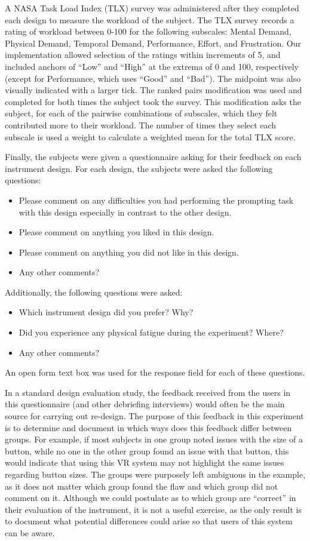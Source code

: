 A NASA Task Load Index (TLX) survey was administered after they completed each design to measure the workload of the subject.
The TLX survey records a rating of workload between 0-100 for the following subscales: Mental Demand, Physical Demand, Temporal Demand, Performance, Effort, and Frustration.
Our implementation allowed selection of the ratings within increments of 5, and included anchors of ``Low'' and ``High'' at the extrema of 0 and 100, respectively (except for Performance, which uses ``Good'' and ``Bad'').
The midpoint was also visually indicated with a larger tick.
The ranked pairs modification was used and completed for both times the subject took the survey.
This modification asks the subject, for each of the pairwise combinations of subscales, which they felt contributed more to their workload.
The number of times they select each subscale is used a weight to calculate a weighted mean for the total TLX score.

Finally, the subjects were given a questionnaire asking for their feedback on each instrument design.
For each design, the subjects were asked the following questions:
\begin{itemize}
    \item Please comment on any difficulties you had performing the prompting task with this design especially in contrast to the other design.
    \item Please comment on anything you liked in this design.
    \item Please comment on anything you did not like in this design.
    \item Any other comments?
\end{itemize}
Additionally, the following questions were asked:
\begin{itemize}
    \item Which instrument design did you prefer? Why?
    \item Did you experience any physical fatigue during the experiment? Where?
    \item Any other comments?
\end{itemize}
An open form text box was used for the response field for each of these questions.

In a standard design evaluation study, the feedback received from the users in this questionnaire (and other debriefing interviews) would often be the main source for carrying out re-design.
The purpose of this feedback in this experiment is to determine and document in which ways does this feedback differ between groups.
For example, if most subjects in one group noted issues with the size of a button, while no one in the other group found an issue with that button, this would indicate that using this VR system may not highlight the same issues regarding button sizes.
The groups were purposely left ambiguous in the example, as it does not matter which group found the flaw and which group did not comment on it.
Although we could postulate as to which group are ``correct'' in their evaluation of the instrument, it is not a useful exercise, as the only result is to document what potential differences could arise so that users of this system can be aware.

